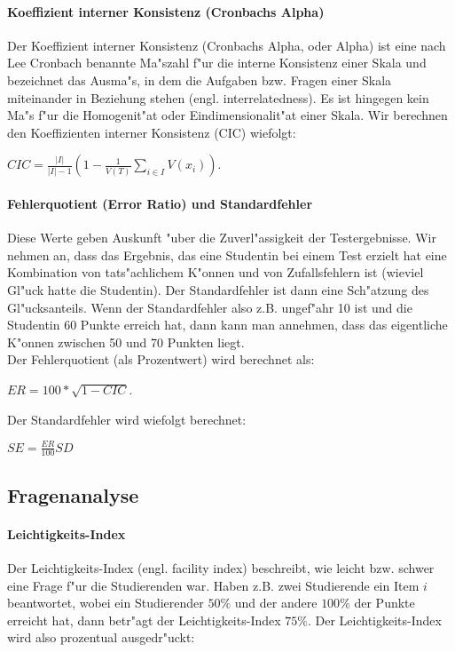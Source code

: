 \documentclass[12pt]{report}
\begin{document}
\paragraph{Koeffizient interner Konsistenz (Cronbachs Alpha)}
Der Koeffizient interner Konsistenz (Cronbachs Alpha, oder Alpha) ist eine nach Lee Cronbach benannte Ma"szahl f"ur die interne Konsistenz einer Skala und bezeichnet das Ausma"s, in dem die Aufgaben bzw. Fragen einer Skala miteinander in Beziehung stehen (engl. interrelatedness). Es ist hingegen kein Ma"s f"ur die Homogenit"at oder Eindimensionalit"at einer Skala. Wir berechnen den Koeffizienten interner Konsistenz (CIC) wiefolgt:

$CIC=\frac{|I|}{|I|-1}\left(1-\frac{1}{V(T)}\sum\limits_{i\in I}V(x_i)\right)$.

\paragraph{Fehlerquotient (Error Ratio) und Standardfehler}
Diese Werte geben Auskunft "uber die Zuverl"assigkeit der Testergebnisse.
Wir nehmen an, dass das Ergebnis, das eine Studentin bei einem Test erzielt hat eine Kombination von
tats"achlichem K"onnen und von Zufallsfehlern ist (wieviel Gl"uck hatte die Studentin). Der Standardfehler ist dann eine Sch"atzung des Gl"ucksanteils.
Wenn der Standardfehler also z.B. ungef"ahr 10 ist und die Studentin 60 Punkte erreich hat, dann kann man annehmen, dass das eigentliche K"onnen zwischen
50 und 70 Punkten liegt.\\
    
Der Fehlerquotient (als Prozentwert) wird berechnet als:

$ER=100*\sqrt{1-CIC}$.

Der Standardfehler wird wiefolgt berechnet:

$SE=\frac{ER}{100}SD$


\subsection{Fragenanalyse}
\label{subsubsec:questions}

\paragraph{Leichtigkeits-Index}
Der Leichtigkeits-Index (engl. facility index) beschreibt, wie leicht bzw. schwer eine Frage f"ur die Studierenden war. 
Haben z.B. zwei Studierende ein Item $i$ beantwortet, wobei ein Studierender $50\%$ und der andere $100\%$ der Punkte erreicht hat, dann betr"agt der Leichtigkeits-Index $75\%$. Der Leichtigkeits-Index wird also prozentual ausgedr"uckt:
\end{document}
